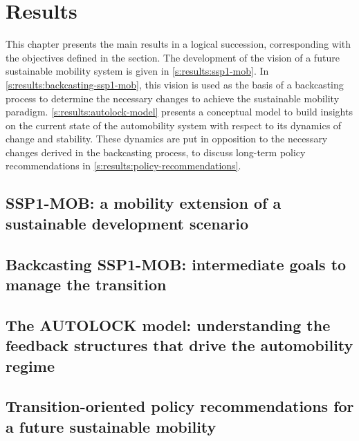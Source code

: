 \chapter{Results}
\label{c:results}

This chapter presents the main results in a logical succession, corresponding with the objectives defined in the  section. The development of the vision of a future sustainable mobility system is given in \autoref{s:results:ssp1-mob}. In \autoref{s:results:backcasting-ssp1-mob}, this vision is used as the basis of a backcasting process to determine the necessary changes to achieve the sustainable mobility paradigm. \autoref{s:results:autolock-model} presents a conceptual model to build insights on the current state of the automobility system with respect to its dynamics of change and stability. These dynamics are put in opposition to the necessary changes derived in the backcasting process, to discuss long-term policy recommendations in \autoref{s:results:policy-recommendations}.

\section[SSP1-MOB sustainable mobility scenario]{SSP1-MOB: a mobility extension of a sustainable development scenario}
\label{s:results:ssp1-mob}


\section[Backcasting SSP1-MOB]{Backcasting SSP1-MOB: intermediate goals to manage the transition}
\label{s:results:backcasting-ssp1-mob}


\section[The AUTOLOCK model]{The AUTOLOCK model: understanding the feedback structures that drive the automobility regime}
\label{s:results:autolock-model}


\section[Transition-oriented policy recommendations]{Transition-oriented policy recommendations for a future sustainable mobility}
\label{s:results:policy-recommendations}
